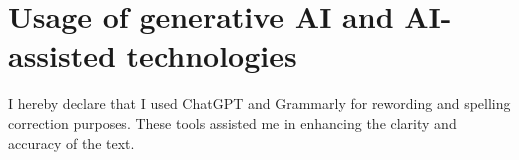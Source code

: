 \section*{Usage of generative AI and AI-assisted technologies}
\label{sec:usage_AI}

I hereby declare that I used ChatGPT and Grammarly for rewording and spelling correction purposes. 
These tools assisted me in enhancing the clarity and accuracy of the text.